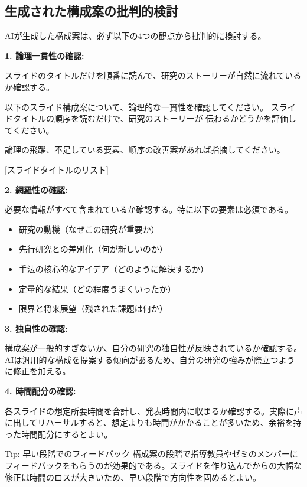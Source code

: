 \subsection{生成された構成案の批判的検討}

AIが生成した構成案は、必ず以下の4つの観点から批判的に検討する。

\textbf{1. 論理一貫性の確認:}

スライドのタイトルだけを順番に読んで、研究のストーリーが自然に流れているか確認する。

\begin{promptbox}
以下のスライド構成案について、論理的な一貫性を確認してください。
スライドタイトルの順序を読むだけで、研究のストーリーが
伝わるかどうかを評価してください。

論理の飛躍、不足している要素、順序の改善案があれば指摘してください。

{[}スライドタイトルのリスト]
\end{promptbox}

\textbf{2. 網羅性の確認:}

必要な情報がすべて含まれているか確認する。特に以下の要素は必須である。

\begin{itemize}
\item 研究の動機（なぜこの研究が重要か）
\item 先行研究との差別化（何が新しいのか）
\item 手法の核心的なアイデア（どのように解決するか）
\item 定量的な結果（どの程度うまくいったか）
\item 限界と将来展望（残された課題は何か）
\end{itemize}

\textbf{3. 独自性の確認:}

構成案が一般的すぎないか、自分の研究の独自性が反映されているか確認する。AIは汎用的な構成を提案する傾向があるため、自分の研究の強みが際立つように修正を加える。

\textbf{4. 時間配分の確認:}

各スライドの想定所要時間を合計し、発表時間内に収まるか確認する。実際に声に出してリハーサルすると、想定よりも時間がかかることが多いため、余裕を持った時間配分にするとよい。

\begin{itembox}[l]{Tip: 早い段階でのフィードバック}
構成案の段階で指導教員やゼミのメンバーにフィードバックをもらうのが効果的である。スライドを作り込んでからの大幅な修正は時間のロスが大きいため、早い段階で方向性を固めるとよい。
\end{itembox}

